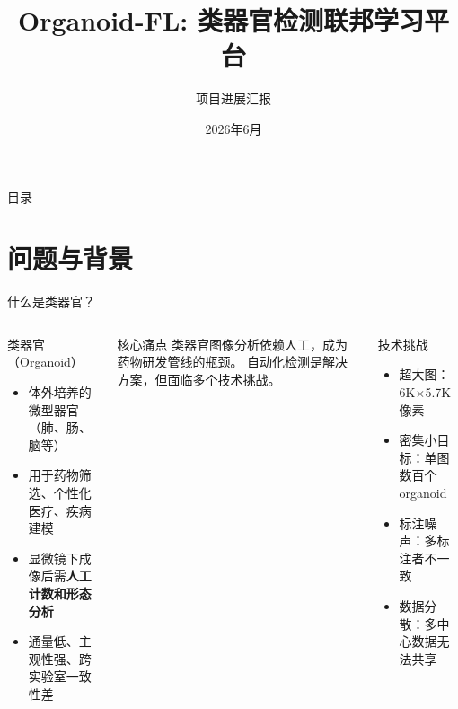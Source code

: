 \documentclass[aspectratio=169, 10pt]{beamer}
\title[Organoid-FL]{Organoid-FL: 类器官检测联邦学习平台}
\subtitle{项目进展汇报}
\date{2026年6月}
\begin{document}
\begin{frame}[plain]
  \titlepage
\end{frame}

\begin{frame}{目录}
  \tableofcontents
\end{frame}

\section{问题与背景}

\begin{frame}{什么是类器官？}
  \begin{columns}[T]
    \begin{block}{类器官（Organoid）}
      \begin{itemize}
        \item 体外培养的微型器官（肺、肠、脑等）
        \item 用于药物筛选、个性化医疗、疾病建模
        \item 显微镜下成像后需\textbf{人工计数和形态分析}
        \item 通量低、主观性强、跨实验室一致性差
      \end{itemize}
    \end{block}
    \vspace{0em}
    \begin{alertblock}{核心痛点}
      类器官图像分析依赖人工，成为药物研发管线的瓶颈。
      自动化检测是解决方案，但面临多个技术挑战。
    \end{alertblock}
    \begin{block}{技术挑战}
      \begin{itemize}
        \item \alert{超大图}：6K$\times$5.7K 像素
        \item \alert{密集小目标}：单图数百个 organoid
        \item \alert{标注噪声}：多标注者不一致
        \item \alert{数据分散}：多中心数据无法共享
      \end{itemize}
    \end{block}
  \end{columns}
\end{frame}
\end{document}
